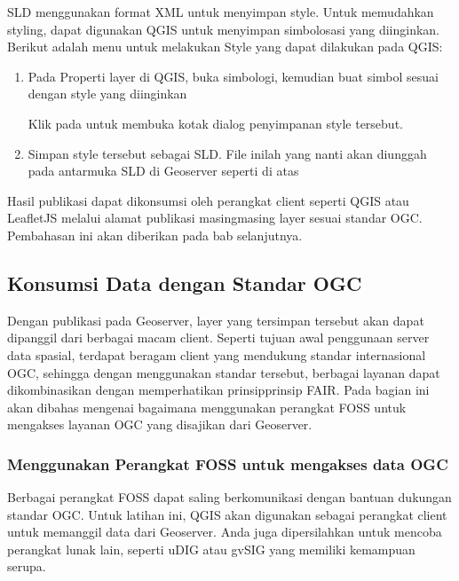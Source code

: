 \documentclass[letterpaper,10pt,english]{sphinxmanual}
\begin{document}
SLD menggunakan format XML untuk menyimpan style. Untuk memudahkan styling, dapat digunakan QGIS untuk menyimpan simbolosasi yang diinginkan. Berikut adalah menu untuk melakukan   Style yang dapat dilakukan pada QGIS:
\begin{enumerate}
%
\item {} 
Pada Properti layer di QGIS, buka simbologi, kemudian buat simbol sesuai dengan style yang diinginkan


Klik pada  untuk membuka kotak dialog penyimpanan style tersebut.

\item {} 
Simpan style tersebut sebagai SLD. File inilah yang nanti akan diunggah pada antarmuka SLD di Geoserver seperti di atas


\end{enumerate}

Hasil publikasi dapat dikonsumsi oleh perangkat client seperti QGIS atau LeafletJS melalui alamat publikasi masing\sphinxhyphen{}masing layer sesuai standar OGC. Pembahasan ini akan diberikan pada bab selanjutnya.


\subsection{Konsumsi Data dengan Standar OGC}
\label{\detokenize{sesi3/konsumsiogc:konsumsi-data-dengan-standar-ogc}}\label{\detokenize{sesi3/konsumsiogc::doc}}
Dengan publikasi pada Geoserver, layer yang tersimpan tersebut akan dapat dipanggil dari berbagai macam client. Seperti tujuan awal penggunaan server data spasial, terdapat beragam client yang mendukung standar internasional OGC, sehingga dengan menggunakan standar tersebut, berbagai layanan dapat dikombinasikan dengan memperhatikan prinsip\sphinxhyphen{}prinsip FAIR. Pada bagian ini akan dibahas mengenai bagaimana menggunakan perangkat FOSS untuk mengakses layanan OGC yang disajikan dari Geoserver.


\subsubsection{Menggunakan Perangkat FOSS untuk mengakses data OGC}
\label{\detokenize{sesi3/konsumsiogc:menggunakan-perangkat-foss-untuk-mengakses-data-ogc}}
Berbagai perangkat FOSS dapat saling berkomunikasi dengan bantuan dukungan standar OGC. Untuk latihan ini, QGIS akan digunakan sebagai perangkat client untuk memanggil data dari Geoserver. Anda juga dipersilahkan untuk mencoba perangkat lunak lain, seperti uDIG atau gvSIG yang memiliki kemampuan serupa.
\end{document}
